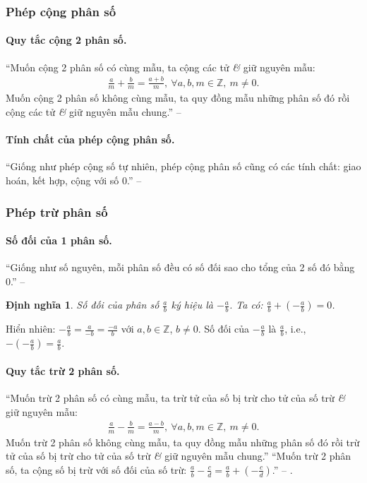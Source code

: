 \documentclass{article}
\numberwithin{equation}{section}
\newtheorem{definition}{Định nghĩa}[section]
\begin{document}
\subsubsection{Phép cộng phân số}

\paragraph{Quy tắc cộng 2 phân số.} ``Muốn cộng 2 phân số có cùng mẫu, ta cộng các tử \textit{\&} giữ nguyên mẫu:
\begin{align*}
	\frac{a}{m} + \frac{b}{m} = \frac{a + b}{m},\ \forall a,b,m\in\mathbb{Z},\ m\ne 0.
\end{align*}
Muốn cộng 2 phân số không cùng mẫu, ta quy đồng mẫu những phân số đó rồi cộng các tử \textit{\&} giữ nguyên mẫu chung.'' -- \cite[pp. 34--35]{Thai_Anh_Dat_Ha_Loan_Nam_Quang_Toan_6_tap_2}

\paragraph{Tính chất của phép cộng phân số.} ``Giống như phép cộng số tự nhiên, phép cộng phân số cũng có các tính chất: giao hoán, kết hợp, cộng với số 0.'' -- \cite[pp. 35]{Thai_Anh_Dat_Ha_Loan_Nam_Quang_Toan_6_tap_2}

\subsubsection{Phép trừ phân số}

\paragraph{Số đối của 1 phân số.} ``Giống như số nguyên, mỗi phân số đều có số đối sao cho tổng của 2 số đó bằng 0.'' -- \cite[pp. 36]{Thai_Anh_Dat_Ha_Loan_Nam_Quang_Toan_6_tap_2}

\begin{definition}
	\emph{Số đối} của phân số $\frac{a}{b}$ ký hiệu là $-\frac{a}{b}$. Ta có: $\frac{a}{b} + \left(-\frac{a}{b}\right) = 0$.
\end{definition}
Hiển nhiên: $-\frac{a}{b} = \frac{a}{-b} = \frac{-a}{b}$ với $a,b\in\mathbb{Z}$, $b\ne 0$. Số đối của $-\frac{a}{b}$ là $\frac{a}{b}$, i.e., $-\left(-\frac{a}{b}\right) = \frac{a}{b}$.

\paragraph{Quy tắc trừ 2 phân số.} ``Muốn trừ 2 phân số có cùng mẫu, ta trừ tử của số bị trừ cho tử của số trừ \textit{\&} giữ nguyên mẫu:
\begin{align*}
	\frac{a}{m} - \frac{b}{m} = \frac{a - b}{m},\ \forall a,b,m\in\mathbb{Z},\ m\ne 0.
\end{align*}
Muốn trừ 2 phân số không cùng mẫu, ta quy đồng mẫu những phân số đó rồi trừ tử của số bị trừ cho tử của số trừ \textit{\&} giữ nguyên mẫu chung.'' ``Muốn trừ 2 phân số, ta cộng số bị trừ với số đối của số trừ: $\frac{a}{b} - \frac{c}{d} = \frac{a}{b} + \left(-\frac{c}{d}\right)$.'' -- \cite[pp. 36--37]{Thai_Anh_Dat_Ha_Loan_Nam_Quang_Toan_6_tap_2}.
\end{document}

